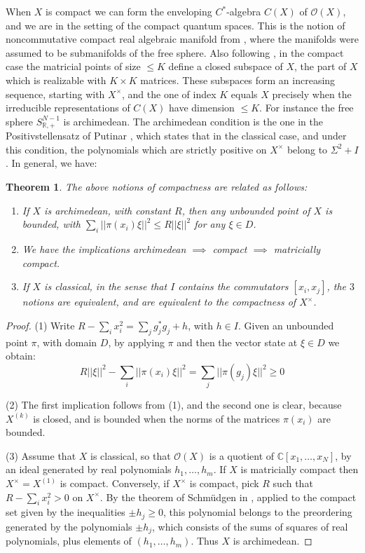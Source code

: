 \documentclass[11pt]{amsart}
\newtheorem{theorem}{Theorem}[section]
\theoremstyle{definition}
\begin{document}
When $X$ is compact we can form the enveloping $C^*$-algebra $C(X)$ of $\mathcal O(X)$, and we are in the setting of the compact quantum spaces. This is the notion of noncommutative compact real algebraic manifold from \cite{bbi}, where the manifolds were assumed to be submanifolds of the free sphere. Also following \cite{bbi}, in the compact case the matricial points of size $\leq K$ define a closed subspace of $X$, the part of $X$ which is realizable with $K\times K$ matrices. These subspaces form an increasing sequence, starting with $X^\times$, and the one of index $K$ equals $X$ precisely when the irreducible representations of $C(X)$ have dimension $\leq K$. For instance the free sphere $S^{N-1}_{\mathbb R,+}$ is archimedean. The archimedean condition is the one in the Positivstellensatz of Putinar \cite{put}, which states that in the classical case, and under this condition, the polynomials which are strictly positive on $X^\times$ belong to $\Sigma^2+I$. In general, we have:

\begin{theorem}\label{t14}
The above notions of compactness are related as follows:
\begin{enumerate}
\item If $X$ is archimedean, with constant $R$, then any unbounded point of $X$ is bounded, with $\sum_i||\pi(x_i)\xi||^2\leq R||\xi||^2$ for any $\xi\in D$.

\item We have the implications archimedean $\implies$ compact $\implies$ matricially compact.

\item If $X$ is classical, in the sense that $I$ contains the commutators $[x_i,x_j]$, the $3$ notions are equivalent, and are equivalent to the compactness of $X^\times$.
\end{enumerate}
\end{theorem}

\begin{proof}
(1) Write $R-\sum_ix_i^2=\sum_jg_j^*g_j+h$, with $h\in I$. Given an unbounded point $\pi$, with domain $D$, by applying $\pi$ and then the vector state at $\xi\in D$ we obtain:
$$R||\xi||^2-\sum_i||\pi(x_i)\xi||^2=\sum_j||\pi(g_j)\xi||^2\geq0$$

(2) The first implication follows from (1), and the second one is clear, because $X^{(k)}$ is closed, and is bounded when the norms of the matrices $\pi(x_i)$ are bounded.

(3) Assume that $X$ is classical, so that $\mathcal O(X)$ is a quotient of $\mathbb C[x_1,\ldots,x_N]$, by an ideal generated by real polynomials $h_1,\ldots,h_m$. If $X$ is matricially compact then $X^\times=X^{(1)}$ is compact. Conversely, if $X^\times$ is compact, pick $R$ such that $R-\sum_ix_i^2>0$ on $X^\times$. By the theorem of Schm\"udgen in \cite{sc1}, applied to the compact set given by the inequalities $\pm h_j\geq0$, this polynomial belongs to the preordering generated by the polynomials $\pm h_j$, which consists of the sums of squares of real polynomials, plus elements of $(h_1,\ldots,h_m)$. Thus $X$ is archimedean.
\end{proof}
\end{document}
